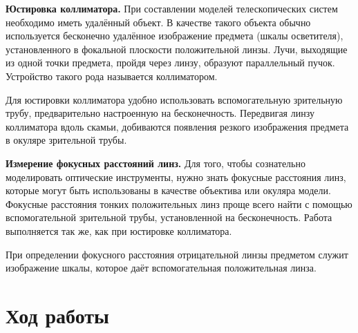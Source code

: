 \documentclass[a4paper,12pt]{article} %
\begin{document}
\textbf{Юстировка коллиматора.} При составлении моделей телескопических систем необходимо иметь удалённый объект. В качестве такого объекта обычно используется бесконечно удалённое изображение предмета (шкалы осветителя), установленного в фокальной плоскости положительной линзы. Лучи, выходящие из одной точки предмета, пройдя через линзу, образуют параллельный пучок. Устройство такого рода называется коллиматором.

Для юстировки коллиматора удобно использовать вспомогательную зрительную трубу, предварительно настроенную на бесконечность. Передвигая линзу коллиматора вдоль скамьи, добиваются появления резкого изображения предмета в окуляре зрительной трубы.

\textbf{Измерение фокусных расстояний линз.} Для того, чтобы сознательно моделировать оптические инструменты, нужно знать фокусные расстояния линз, которые могут быть использованы в качестве объектива или окуляра модели. Фокусные расстояния тонких положительных линз проще всего найти с помощью вспомогательной зрительной трубы, установленной на бесконечность. Работа выполняется так же, как при юстировке коллиматора.

При определении фокусного расстояния отрицательной линзы предметом служит изображение шкалы, которое даёт вспомогательная положительная линза.

\section{Ход работы}
\end{document}
